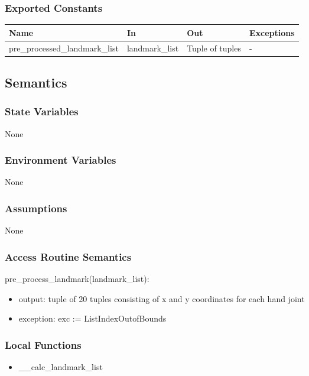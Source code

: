 \documentclass[12pt, titlepage]{article}
\begin{document}
\subsubsection{Exported Constants}

\begin{center}
\begin{tabular}{p{5cm} p{3cm} p{3cm} p{4cm}}
\hline
\textbf{Name} & \textbf{In} & \textbf{Out} & \textbf{Exceptions} \\
\hline
pre\_processed\_landmark\_list & landmark\_list & Tuple of tuples & - \\
\hline
\end{tabular}
\end{center}

\subsection{Semantics}

\subsubsection{State Variables}

None

\subsubsection{Environment Variables}

None

\subsubsection{Assumptions}

None

\subsubsection{Access Routine Semantics}

\noindent pre\_process\_landmark(landmark\_list):
\begin{itemize}
\item output: tuple of 20 tuples consisting of x and y coordinates for each hand joint
\item exception: exc := ListIndexOutofBounds
\end{itemize}

\subsubsection{Local Functions}
\begin{itemize}
\item \_\_calc\_landmark\_list
\end{itemize}
\end{document}
